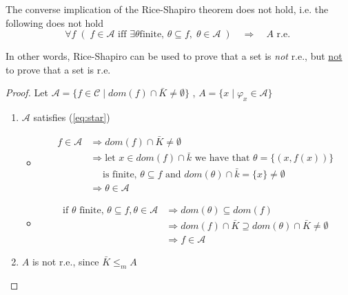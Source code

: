 \begin{observation}
  The converse implication of the Rice-Shapiro theorem does not hold, i.e. the following does not hold
  \begin{equation}\label{eq:star}
    \forall f \; (\; f \in \mathcal{A} \mbox{ iff } \exists \theta \mbox{
      finite, } \theta \subseteq f, \; \theta \in \mathcal{A} \; ) \quad
    \Rightarrow \quad A \mbox{ r.e. }
  \end{equation}

  In other words, Rice-Shapiro can be used to prove that a set is
  \emph{not} r.e., but \underline{not} to prove that a set is r.e.
  \begin{proof}
    Let
    $\mathcal{A} = \{ f \in \mathcal{C} \mid dom(f) \cap \bar{K} \neq
    \emptyset\}$ , $A = \{x \mid \varphi_x \in \mathcal{A}\}$
  
    \begin{enumerate}
    \item $\mathcal{A}$ satisfies (\ref{eq:star})
      \begin{itemize}
      \item[] 
          \begin{align*}
            f \in \mathcal{A} & \Rightarrow dom(f) \cap \bar{K} \neq \emptyset \\
                                         & \Rightarrow \mbox{let } x \in dom(f) \cap \bar{k} \mbox{ we have that } \theta = \{(x, f(x))\} \\
                                         & \quad \mbox{ is finite, } \theta \subseteq f \mbox{ and } dom(\theta)\cap \bar{k} = \{x\} \neq \emptyset \\
                                         & \Rightarrow \theta \in \mathcal{A}
          \end{align*}
        
  
      \item[]
      \[
          \begin{aligned}
            \mbox{if $\theta$ finite, } \theta \subseteq f, \theta \in \mathcal{A} & \Rightarrow dom(\theta) \subseteq dom(f) \\
            & \Rightarrow dom(f) \cap \bar{K} \supseteq dom(\theta) \cap \bar{K} \neq \emptyset \\
            & \Rightarrow f \in \mathcal{A}
          \end{aligned}
        \]
      \end{itemize}
  
    \item $A$ is not r.e., since $\bar{K} \leq_m A$
  

\end{enumerate}
\end{proof}
\end{observation}
